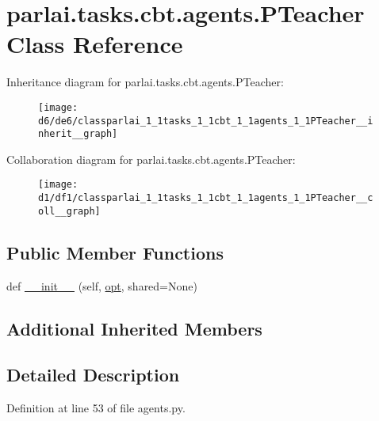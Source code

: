 \hypertarget{classparlai_1_1tasks_1_1cbt_1_1agents_1_1PTeacher}{}\section{parlai.\+tasks.\+cbt.\+agents.\+P\+Teacher Class Reference}
\label{classparlai_1_1tasks_1_1cbt_1_1agents_1_1PTeacher}


Inheritance diagram for parlai.\+tasks.\+cbt.\+agents.\+P\+Teacher\+:\nopagebreak
\begin{figure}[H]
\begin{center}
\leavevmode
\texttt{[image: d6/de6/classparlai\_1\_1tasks\_1\_1cbt\_1\_1agents\_1\_1PTeacher\_\_inherit\_\_graph]}
\end{center}
\end{figure}


Collaboration diagram for parlai.\+tasks.\+cbt.\+agents.\+P\+Teacher\+:\nopagebreak
\begin{figure}[H]
\begin{center}
\leavevmode
\texttt{[image: d1/df1/classparlai\_1\_1tasks\_1\_1cbt\_1\_1agents\_1\_1PTeacher\_\_coll\_\_graph]}
\end{center}
\end{figure}
\subsection*{Public Member Functions}
\begin{DoxyCompactItemize}
\item 
def \hyperlink{classparlai_1_1tasks_1_1cbt_1_1agents_1_1PTeacher_a8433c2ae6d5202b4646baa3db9fbeb38}{\+\_\+\+\_\+init\+\_\+\+\_\+} (self, \hyperlink{classparlai_1_1core_1_1teachers_1_1FbDialogTeacher_af7a9ec497b9cd0292d7b8fa220da7c28}{opt}, shared=None)
\end{DoxyCompactItemize}
\subsection*{Additional Inherited Members}


\subsection{Detailed Description}


Definition at line 53 of file agents.\+py.



